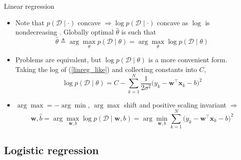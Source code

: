 \documentclass{beamer}
\numberwithin{equation}{section}
\newcommand{\aref}[1]{\alert{\ref{#1}}}
\begin{document}
\begin{frame}{Linear regression}
    \begin{itemize}
        \item
        Note that $ p(\mathcal{D} \mid \cdot) $ concave $ \Rightarrow
        \log p(\mathcal{D} \mid \cdot) $ concave as $ \log $ is nondecreasing
        \cite{bv_convex_opt}. Globally optimal $ \hat{\theta} $ is such that
        \begin{equation*}
            \hat{\theta} \triangleq \arg\max_\theta p(\mathcal{D} \mid \theta)
            = \arg\max_\theta \log p(\mathcal{D} \mid \theta)
        \end{equation*}

        \item
        Problems are equivalent, but $ \log p(\mathcal{D} \mid \theta) $ is a
        more convenient form. Taking the log of (\aref{linreg_like}) and
        collecting constants into $ C $,
        \begin{equation*}
            \log p(\mathcal{D} \mid \theta) = C - \sum_{k = 1}^N
                \frac{1}{2\sigma^2}\big(
                    y_k - \mathbf{w}^\top\mathbf{x}_k - b
                \big)^2
        \end{equation*}

        \item
        $ \arg\max = -\arg\min $, $ \arg\max $ shift and positive scaling
        invariant $ \Rightarrow $
        \begin{equation} \label{linreg_like2cost}
            \hat{\mathbf{w}}, \hat{b} =
            \arg\max_{\mathbf{w}, b}\log p(\mathcal{D} \mid \mathbf{w}, b) =
            \arg\min_{\mathbf{w}, b}\sum_{k = 1}^N\big(
                y_k - \mathbf{w}^\top\mathbf{x}_k - b
            \big)^2
        \end{equation}
    \end{itemize}
\end{frame}

\subsection{Logistic regression}
\end{document}

